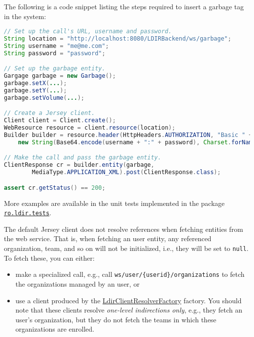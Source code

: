 The following is a code snippet listing the steps required to insert a garbage
tag in the system:
\begin{lstlisting}[language=Java]
// Set up the call's URL, username and password.
String location = "http://localhost:8080/LDIRBackend/ws/garbage";
String username = "me@me.com";
String password = "password";

// Set up the garbage entity.
Gargage garbage = new Garbage();
garbage.setX(...);
garbage.setY(...);
garbage.setVolume(...);

// Create a Jersey client.
Client client = Client.create();
WebResource resource = client.resource(location);
Builder builder = resource.header(HttpHeaders.AUTHORIZATION, "Basic " +
    new String(Base64.encode(username + ":" + password), Charset.forName("ASCII")));

// Make the call and pass the garbage entity.
ClientResponse cr = builder.entity(garbage, 
        MediaType.APPLICATION_XML).post(ClientResponse.class); 

assert cr.getStatus() == 200;
\end{lstlisting}

More examples are available in the unit tests implemented in the package
\href{http://code.google.com/p/letsdoitromania2011/source/browse/#svn\%2Ftrunk\%2FWeb\%2FService\%2FLDIRBackendTests\%2Fsrc\%2Fro\%2Fldir\%2Ftests}{\texttt{ro.ldir.tests}}.

\begin{note}
The default Jersey client does not resolve references when fetching entities
from the web service. That is, when fetching an user entity, any referenced
organization, team, and so on will not be initialized, i.e., they will be set to
\texttt{null}. To fetch these, you can either:
\begin{itemize}
  \item make a specialized call, e.g., call
    \texttt{\footnotesize{\baselocation}ws/user/\{userid\}/organizations} to
    fetch the organizations managed by an user, or
  \item use a client produced by the
    \href{http://code.google.com/p/letsdoitromania2011/source/browse/trunk/Web/Service/LDIRBackendEJBClient/ejbModule/ro/ldir/idresolver/LdirClientResolverFactory.java}{LdirClientResolverFactory}
    factory. You should note that these clients resolve \emph{one-level
    indirections only}, e.g., they fetch an user's organization, but they do not
    fetch the teams in which these organizations are enrolled.
\end{itemize}
\end{note}
